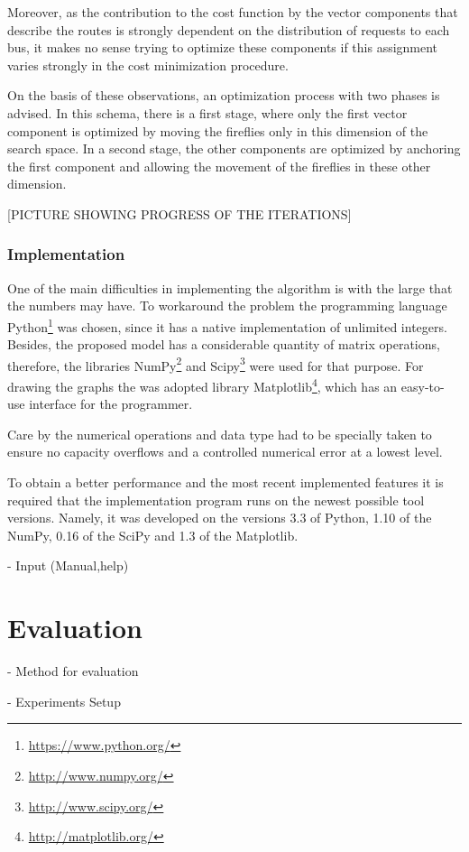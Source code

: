 \documentclass[tuberlin,cic,tc,openright,english,noabntcite]{iiufrgs}
\begin{document}
Moreover, as the contribution to the cost function by the vector components that describe the routes is strongly dependent on the distribution of requests to each bus, it makes no sense trying to optimize these components if this assignment varies strongly in the cost minimization procedure.

On the basis of these observations, an optimization process with two phases is advised. In this schema, there is a first stage, where only the first vector component is optimized by moving the fireflies only in this dimension of the search space. In a second stage, the other components are optimized by anchoring the first component and allowing the movement of the fireflies in these other dimension.

[PICTURE SHOWING PROGRESS OF THE ITERATIONS]

\subsection{Implementation}
One of the main difficulties in implementing the algorithm is with the large that the numbers may have. To workaround the problem the programming language Python\footnote{\url{https://www.python.org/}} was chosen, since it has a native implementation of unlimited integers. Besides, the proposed model has a considerable quantity of matrix operations, therefore, the libraries NumPy\footnote{\url{http://www.numpy.org/}} and Scipy\footnote{\url{http://www.scipy.org/}} were used for that purpose. For drawing the graphs the was adopted library Matplotlib\footnote{\url{http://matplotlib.org/}}, which has an easy-to-use interface for the programmer.

Care by the numerical operations and data type had to be specially taken to ensure no capacity overflows and a controlled numerical error at a lowest level.

To obtain a better performance and the most recent implemented features it is required that the implementation program runs on the newest possible tool versions. Namely, it was developed on the versions 3.3 of Python, 1.10 of the NumPy, 0.16 of the SciPy and 1.3 of the Matplotlib.

- Input (Manual,help)

\chapter{Evaluation}
- Method for evaluation

- Experiments Setup
\end{document}
